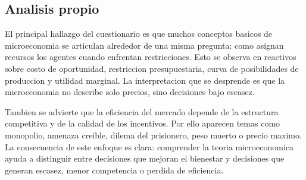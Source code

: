 \documentclass[
	spanish,
	letterpaper, oneside
]{article}
\begin{document}
%

\subsection{Analisis propio}

El principal hallazgo del cuestionario es que muchos conceptos basicos de microeconomia se articulan alrededor de una misma pregunta: como asignan recursos los agentes cuando enfrentan restricciones. Esto se observa en reactivos sobre costo de oportunidad, restriccion presupuestaria, curva de posibilidades de produccion y utilidad marginal. La interpretacion que se desprende es que la microeconomia no describe solo precios, sino decisiones bajo escasez.

Tambien se advierte que la eficiencia del mercado depende de la estructura competitiva y de la calidad de los incentivos. Por ello aparecen temas como monopolio, amenaza creible, dilema del prisionero, peso muerto o precio maximo. La consecuencia de este enfoque es clara: comprender la teoria microeconomica ayuda a distinguir entre decisiones que mejoran el bienestar y decisiones que generan escasez, menor competencia o perdida de eficiencia.

\end{document}
